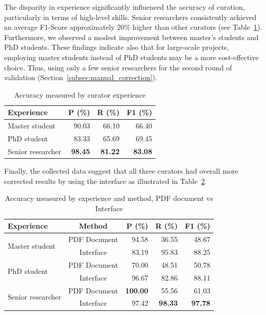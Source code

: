 \documentclass[a4paper]{article}
\begin{document}
The disparity in experience significantly influenced the accuracy of curation, particularly in terms of high-level skills. Senior researchers consistently achieved an average F1-Score approximately 20\% higher than other curators (see Table~\ref{tab:accuracy-by-experience}). Furthermore, we observed a modest improvement between master's students and PhD students. These findings indicate also that for large-scale projects, employing master students instead of PhD students may be a more cost-effective choice. Thus, using only a few senior researchers for the second round of validation (Section~\ref{subsec:manual_correction}).

\begin{table}[h]
\centering
\caption{Accuracy measured by curator experience}
\begin{tabular}{lrrr}
\toprule
\textbf{Experience} & \textbf{P (\%)}   & \textbf{R (\%)}   & \textbf{F1 (\%)}  \\
\midrule
Master student      & 90.03             & 66.10             & 66.40             \\
PhD student         & 83.33             & 65.69             & 69.45             \\
Senior researcher   & \textbf{98.45}    & \textbf{81.22}    & \textbf{83.08}    \\
\bottomrule
\end{tabular}
\label{tab:accuracy-by-experience}
\end{table}

Finally, the collected data suggest that all three curators had overall more corrected results by using the interface as illustrated in Table~\ref{tab:accuracy-by-experience-method}. 

\begin{table}[h]
\centering
\caption{Accuracy measured by experience and method, PDF document vs Interface}
\begin{tabular}{lcrrr}
\toprule
\textbf{Experience} & \textbf{Method} & \textbf{P (\%)} & \textbf{R (\%)} & 
\textbf{F1 (\%)} \\
\midrule
\multirow{2}{*}{Master student} & PDF Document & 94.58 & 36.55 & 48.67 \\
 & Interface & 83.19 & 95.83 & 88.25 \\
\midrule
\multirow{2}{*}{PhD student} & PDF Document & 70.00 & 48.51 & 50.78 \\
 & Interface & 96.67 & 82.86 & 88.11 \\
\midrule
\multirow{2}{*}{Senior researcher} & PDF Document & \textbf{100.00} & 55.56 & 61.03 \\
 & Interface & 97.42 & \textbf{98.33} & \textbf{97.78} \\
\bottomrule
\end{tabular}
\label{tab:accuracy-by-experience-method}
\end{table}
\end{document}
